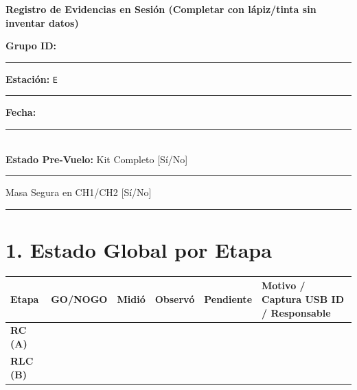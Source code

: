 \documentclass[11pt, a4paper]{article}
\begin{document}
\begin{tcolorbox}[colback=ucbblue!5!white, colframe=ucbblue, title=\textbf{Artefacto A2: Hoja de Banco, Datos y Configuración Instrumental}]
    \centering \textbf{Registro de Evidencias en Sesión (Completar con lápiz/tinta sin inventar datos)}
\end{tcolorbox}

\textbf{Grupo ID:} \rule{2cm}{0.4pt} \quad \textbf{Estación:} \texttt{E}\rule{1cm}{0.4pt} \quad \textbf{Fecha:} \rule{3cm}{0.4pt} \\
\textbf{Estado Pre-Vuelo:} Kit Completo [Sí/No] \rule{1cm}{0.4pt} \quad Masa Segura en CH1/CH2 [Sí/No] \rule{1cm}{0.4pt}

\section*{1. Estado Global por Etapa}
\renewcommand{\arraystretch}{1.5}
\noindent
\begin{tabularx}{\textwidth}{
  >{\bfseries\hsize=0.6\hsize}X 
  >{\centering\arraybackslash\hsize=0.6\hsize}X 
  >{\centering\arraybackslash\hsize=0.6\hsize}X 
  >{\centering\arraybackslash\hsize=0.6\hsize}X 
  >{\centering\arraybackslash\hsize=0.6\hsize}X 
  >{\RaggedRight\arraybackslash\hsize=2.0\hsize}X}
\toprule
\textbf{Etapa} & \textbf{GO/NOGO} & \textbf{Midió} & \textbf{Observó} & \textbf{Pendiente} & \textbf{Motivo / Captura USB ID / Responsable} \\
\midrule
RC (A) & & & & & \\ \addlinespace
RLC (B) & & & & & \\
\bottomrule
\end{tabularx}
\end{document}
